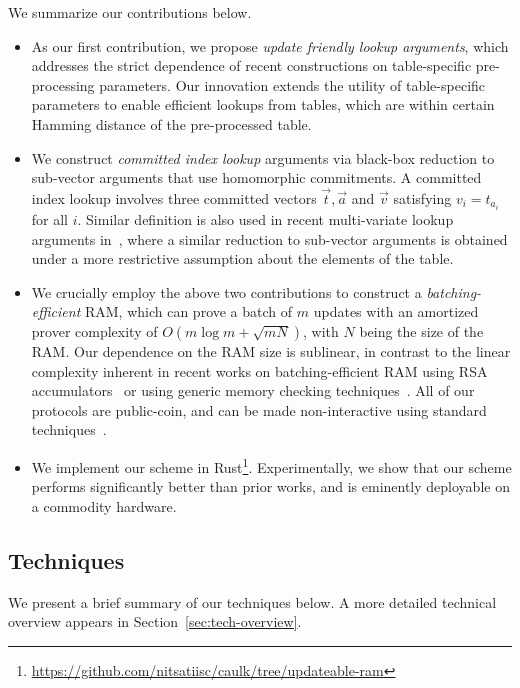 We summarize our contributions below.
\begin{itemize}[leftmargin=2em]
	\item As our first contribution, we propose {\em update friendly lookup arguments}, which addresses
	the strict dependence of recent constructions on table-specific pre-processing parameters. Our
	innovation extends the utility of table-specific parameters to enable efficient lookups from tables,
	which are within certain Hamming distance of the pre-processed table.
	\item We construct {\em committed index lookup} arguments via black-box reduction to
	sub-vector arguments that use homomorphic commitments. A committed index lookup involves
	three committed vectors $\vec{t},\vec{a}$ and $\vec{v}$ satisfying $v_i=t_{a_i}$ for all $i$. Similar
	definition is also used in recent multi-variate lookup arguments in~\cite{lasso}, where a similar reduction
	to sub-vector arguments is obtained under a more restrictive assumption about the elements of the table.
	\item We crucially employ the above two contributions to construct a {\em batching-efficient} RAM, which
	can prove a batch of $m$ updates with an amortized prover complexity of $O(m\log m + \sqrt{mN})$,
	with $N$ being the size of the RAM. Our dependence on the RAM size is sublinear, in contrast to the linear complexity
	inherent in recent works on batching-efficient RAM using RSA accumulators~\cite{USENIX:OWWB20,CCS:CFHKKO22} or using generic memory checking techniques~\cite{NDSS:WSRBW15,USENIX:BCTV14,C:BCGTV13,SP:ZGKPP18}. All of our protocols are public-coin, and can be made non-interactive using standard techniques~\cite{C:FiaSha86}. 
	
	\item We implement our scheme in Rust\footnote{\url{https://github.com/nitsatiisc/caulk/tree/updateable-ram}}.
	Experimentally, we show that our scheme performs significantly better than prior works,
	and is eminently deployable on a commodity hardware.
\end{itemize}


\subsection{Techniques}\label{subsec:techniques}

We present a brief summary of our techniques below. A more detailed technical overview appears in Section~\ref{sec:tech-overview}.

\smallskip

